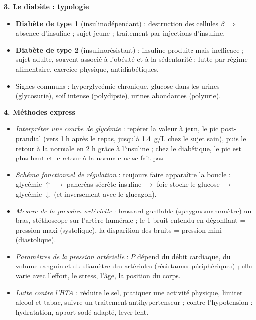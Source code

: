 \documentclass[11pt]{article}
\newcommand{\cle}[1]{{\popxbold\color{popdark}#1}}
\begin{document}
\begin{bilan}
\textbf{3. Le diabète : typologie}
\begin{itemize}
  \item \textbf{Diabète de type 1} (insulinodépendant) : destruction des cellules $\beta$ $\Rightarrow$ absence d'insuline ; sujet jeune ; traitement par injections d'insuline.
  \item \textbf{Diabète de type 2} (insulinorésistant) : insuline produite mais inefficace ; sujet adulte, souvent associé à l'obésité et à la sédentarité ; lutte par régime alimentaire, exercice physique, antidiabétiques.
  \item Signes communs : hyperglycémie chronique, glucose dans les urines (\cle{glycosurie}), soif intense (polydipsie), urines abondantes (polyurie).
\end{itemize}

\textbf{4. Méthodes express}
\begin{itemize}
  \item \emph{Interpréter une courbe de glycémie} : repérer la valeur à jeun, le pic post-prandial (vers 1 h après le repas, jusqu'à \SI{1,4}{g/L} chez le sujet sain), puis le retour à la normale en 2 h grâce à l'insuline ; chez le diabétique, le pic est plus haut et le retour à la normale ne se fait pas.
  \item \emph{Schéma fonctionnel de régulation} : toujours faire apparaître la boucle : glycémie $\uparrow$ $\rightarrow$ pancréas sécrète insuline $\rightarrow$ foie stocke le glucose $\rightarrow$ glycémie $\downarrow$ (et inversement avec le glucagon).
  \item \emph{Mesure de la pression artérielle} : brassard gonflable (sphygmomanomètre) au bras, stéthoscope sur l'artère humérale ; le 1\ier{} bruit entendu en dégonflant = pression maxi (systolique), la disparition des bruits = pression mini (diastolique).
  \item \emph{Paramètres de la pression artérielle} : $P$ dépend du débit cardiaque, du volume sanguin et du diamètre des artérioles (résistances périphériques) ; elle varie avec l'effort, le stress, l'âge, la position du corps.
  \item \emph{Lutte contre l'HTA} : réduire le sel, pratiquer une activité physique, limiter alcool et tabac, suivre un traitement antihypertenseur ; contre l'hypotension : hydratation, apport sodé adapté, lever lent.
\end{itemize}
\end{bilan}
\end{document}
